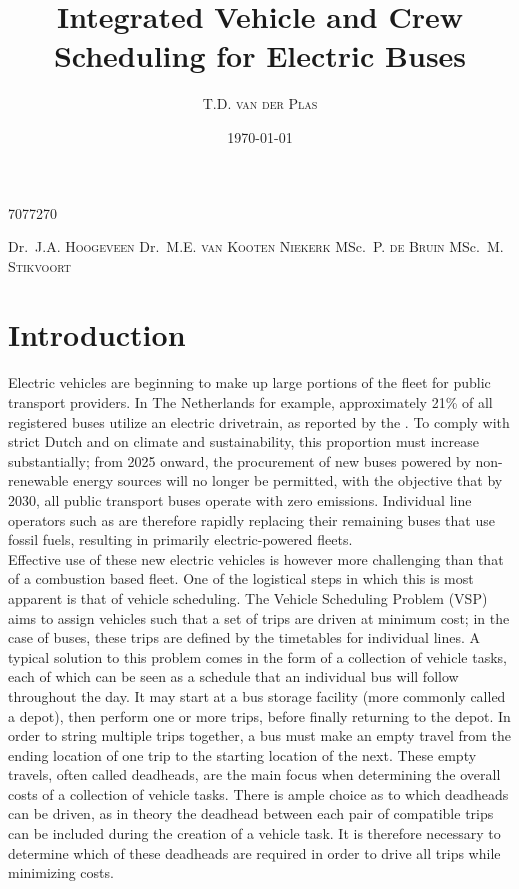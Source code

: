 \documentclass[]{article}
\begin{document}
\title{Integrated Vehicle and Crew Scheduling for Electric Buses}
\author
    {T.D. \textsc{van der Plas}} %
    {7077270}           %
\date{\today}

\supervisors
    {Dr.~J.A. \textsc{Hoogeveen}} %
    {Dr.~M.E. \textsc{van Kooten Niekerk}} %
    {MSc.~P. \textsc{de Bruin}} %
    {MSc.~M. \textsc{Stikvoort}} %



\section{Introduction}
Electric vehicles are beginning to make up large portions of the fleet for public transport providers. In The Netherlands for example, approximately 21\% of all registered buses utilize an electric drivetrain, as reported by the \citet{RDW}. To comply with strict Dutch and \citet{europaRegulation20181999} on climate and sustainability, this proportion must increase substantially; from 2025 onward, the procurement of new buses powered by non-renewable energy sources will no longer be permitted, with the objective that by 2030, all public transport buses operate with zero emissions. Individual line operators such as \citet{qbuzzQbuzz} are therefore rapidly replacing their remaining buses that use fossil fuels, resulting in primarily electric-powered fleets. \\
Effective use of these new electric vehicles is however more challenging than that of a combustion based fleet. One of the logistical steps in which this is most apparent is that of vehicle scheduling. The Vehicle Scheduling Problem (VSP) aims to assign vehicles such that a set of trips are driven at minimum cost; in the case of buses, these trips are defined by the timetables for individual lines. A typical solution to this problem comes in the form of a collection of vehicle tasks, each of which can be seen as a schedule that an individual bus will follow throughout the day. It may start at a bus storage facility (more commonly called a depot), then perform one or more trips, before finally returning to the depot. In order to string multiple trips together, a bus must make an empty travel from the ending location of one trip to the starting location of the next. These empty travels, often called deadheads, are the main focus when determining the overall costs of a collection of vehicle tasks. There is ample choice as to which deadheads can be driven, as in theory the deadhead between each pair of compatible trips can be included during the creation of a vehicle task. It is therefore necessary to determine which of these deadheads are required in order to drive all trips while minimizing costs. \\
\end{document}
